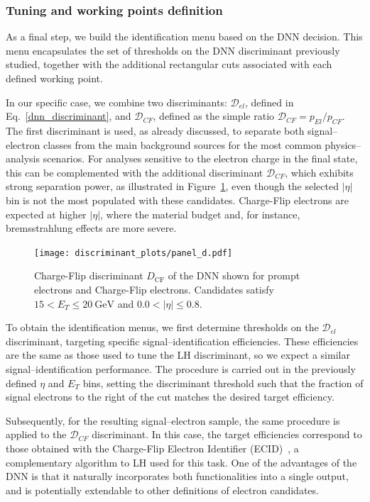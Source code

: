 \subsubsection{Tuning and working points definition}
\label{dnn:tuning}

As a final step, we build the identification menu based on the DNN decision. This menu encapsulates the set of thresholds on the DNN discriminant previously studied, together with the additional rectangular cuts associated with each defined working point.

In our specific case, we combine two discriminants: $\mathcal{D}_{el}$, defined in Eq.~\ref{dnn_discriminant}, and $\mathcal{D}_{CF}$, defined as the simple ratio $\mathcal{D}_{CF} = p_{El}/p_{CF}$. The first discriminant is used, as already discussed, to separate both signal–electron classes from the main background sources for the most common physics–analysis scenarios. For analyses sensitive to the electron charge in the final state, this can be complemented with the additional discriminant $\mathcal{D}_{CF}$, which exhibits strong separation power, as illustrated in Figure~\ref{fig:cf_discriminant}, even though the selected $|\eta|$ bin is not the most populated with these candidates. Charge-Flip electrons are expected at higher $|\eta|$, where the material budget and, for instance, bremsstrahlung effects are more severe.
\begin{figure}[htbp]
  \centering
  \texttt{[image: discriminant\_plots/panel\_d.pdf]}
  \caption{Charge-Flip discriminant $D_{\mathrm{CF}}$ of the DNN shown for prompt electrons and
  Charge-Flip electrons. Candidates satisfy $15<E_{T}\leq 20~\mathrm{GeV}$ and $0.0<|\eta|\leq 0.8$.}
  \label{fig:cf_discriminant}
\end{figure}

To obtain the identification menus, we first determine thresholds on the $\mathcal{D}_{el}$ discriminant, targeting specific signal–identification efficiencies. These efficiencies are the same as those used to tune the LH discriminant, so we expect a similar signal–identification performance. The procedure is carried out in the previously defined $\eta$ and $E_{T}$ bins, setting the discriminant threshold such that the fraction of signal electrons to the right of the cut matches the desired target efficiency.

Subsequently, for the resulting signal–electron sample, the same procedure is applied to the $\mathcal{D}_{CF}$ discriminant. In this case, the target efficiencies correspond to those obtained with the Charge-Flip Electron Identifier (ECID)~\cite{Aaboud:2657964}, a complementary algorithm to LH used for this task. One of the advantages of the DNN is that it naturally incorporates both functionalities into a single output, and is potentially extendable to other definitions of electron candidates.

